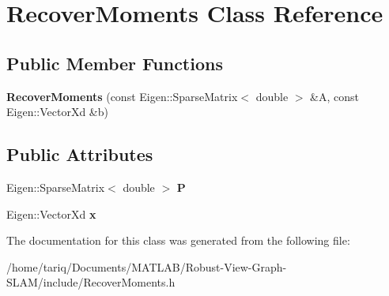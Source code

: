 \hypertarget{classRecoverMoments}{}\section{Recover\+Moments Class Reference}
\label{classRecoverMoments}
\subsection*{Public Member Functions}
\begin{DoxyCompactItemize}
\item 
{\bfseries Recover\+Moments} (const Eigen\+::\+Sparse\+Matrix$<$ double $>$ \&A, const Eigen\+::\+Vector\+Xd \&b)\hypertarget{classRecoverMoments_a8653cd56de0d2b208428d8d93e37431c}{}\label{classRecoverMoments_a8653cd56de0d2b208428d8d93e37431c}

\end{DoxyCompactItemize}
\subsection*{Public Attributes}
\begin{DoxyCompactItemize}
\item 
Eigen\+::\+Sparse\+Matrix$<$ double $>$ {\bfseries P}\hypertarget{classRecoverMoments_a3e1c991fafc11e3320b314b96e42e81a}{}\label{classRecoverMoments_a3e1c991fafc11e3320b314b96e42e81a}

\item 
Eigen\+::\+Vector\+Xd {\bfseries x}\hypertarget{classRecoverMoments_a7d791f3d785a9bbb47dfce68e100e481}{}\label{classRecoverMoments_a7d791f3d785a9bbb47dfce68e100e481}

\end{DoxyCompactItemize}


The documentation for this class was generated from the following file\+:\begin{DoxyCompactItemize}
\item 
/home/tariq/\+Documents/\+M\+A\+T\+L\+A\+B/\+Robust-\/\+View-\/\+Graph-\/\+S\+L\+A\+M/include/Recover\+Moments.\+h\end{DoxyCompactItemize}
